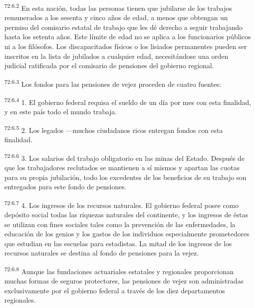 \par
\textsuperscript{72:6.2} En esta nación, todas las personas tienen que jubilarse de los trabajos remunerados a los sesenta y cinco años de edad, a menos que obtengan un permiso del comisario estatal de trabajo que les dé derecho a seguir trabajando hasta los setenta años. Este límite de edad no se aplica a los funcionarios públicos ni a los filósofos. Los discapacitados físicos o los lisiados permanentes pueden ser inscritos en la lista de jubilados a cualquier edad, necesitándose una orden judicial ratificada por el comisario de pensiones del gobierno regional.

\par
\textsuperscript{72:6.3} Los fondos para las pensiones de vejez proceden de cuatro fuentes:

\par
\textsuperscript{72:6.4} 1. El gobierno federal requisa el sueldo de un día por mes con esta finalidad, y en este país todo el mundo trabaja.

\par
\textsuperscript{72:6.5} 2. Los legados ---muchos ciudadanos ricos entregan fondos con esta finalidad.

\par
\textsuperscript{72:6.6} 3. Los salarios del trabajo obligatorio en las minas del Estado. Después de que los trabajadores reclutados se mantienen a sí mismos y apartan las cuotas para su propia jubilación, todo los excedentes de los beneficios de su trabajo son entregados para este fondo de pensiones.

\par
\textsuperscript{72:6.7} 4. Los ingresos de los recursos naturales. El gobierno federal posee como depósito social todas las riquezas naturales del continente, y los ingresos de éstas se utilizan con fines sociales tales como la prevención de las enfermedades, la educación de los genios y los gastos de los individuos especialmente prometedores que estudian en las escuelas para estadistas. La mitad de los ingresos de los recursos naturales se destina al fondo de pensiones para la vejez.

\par
\textsuperscript{72:6.8} Aunque las fundaciones actuariales estatales y regionales proporcionan muchas formas de seguros protectores, las pensiones de vejez son administradas exclusivamente por el gobierno federal a través de los diez departamentos regionales.


